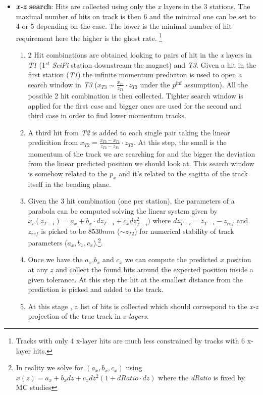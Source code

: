 \documentclass[paper=a4, fontsize=10pt]{scrartcl}
\numberwithin{equation}{section}		%
\numberwithin{figure}{section}			%
\numberwithin{table}{section}				%
\begin{document}
\begin{itemize}
  \item{\textbf{\textit{x-z} search}: Hits are collected using only the \textit{x} layers in the 3 stations. The maximal number of hits on track is then 6 and the minimal one can be set to 4 or 5 depending on the case. The lower is the minimal number of hit requirement here the higher is the ghost rate. \footnote{Tracks with only 4 x-layer hits are much less constrained by tracks with 6 x-layer hits.}}
    \begin{enumerate}
      \item{2 Hit combinations are obtained looking to pairs of hit in the \textit{x} layers in \textit{T1} (1$^{st}$ \textit{SciFi} station downstream the magnet) and \textit{T3}. Given a hit in the first station (\textit{T1}) the infinite momentum prediciton is used to open a search window in \textit{T3} ($x_{T3} \sim \frac{x_{T1}}{z_{T1}}\cdot z_{T3}$ under the $p^{\inf}$ assumption). All the possible 2 hit combination is then collected. Tighter search window is applied for the first \textit{case} and bigger ones are used for the second and third case in order to find lower momentum tracks.}
      \item{A third hit  from \textit{T2} is added to each single pair taking the linear predicition from $x_{T2} = \frac{x_{T3}-x_{T1}}{z_{T3}-z_{T1}}\cdot z_{T2}$. At this step, the small is the momentum of the track we are searching for and the bigger the deviation from the linear predicted position we should look at. This search window is somehow related to the $p_{x}$ and it's related to the sagitta of the track itself in the bending plane.}
      \item{Given the 3 hit combination (one per station), the parameters of a parabola can be computed solving the linear system given by $x_{i}(z_{T-i})= a_{x}+b_{x}\cdot dz_{T-i}+c_{x}dz_{T-i}^{2})$ where $dz_{T-i} = z_{T-i}-z_{ref}$ and $z_{ref}$ is picked to be $8530 mm$ ($\sim z_{T2}$) for numerical stability of track parameters ($a_{x},b_{x},c_{x}$).\footnote{In reality we solve for $(a_{x},b_{x},c_{x})$ using $x(z)=a_{x}+b_{x}dz+c_{x}dz^{2}(1+dRatio\cdot dz)$ where the \textit{dRatio} is fixed by MC studies}}.
      \item{Once we have the $a_{x}$,$b_{x}$ and $c_{x}$ we can compute the predicted $x$ position at any $z$ and collect the found hits around the expected position inside a given tolerance. At this step the hit at the smallest distance from the prediction is picked and added to the track.}
      \item{At this stage , a list of hits is collected which should correspond to the \textit{x-z} projection of the true track in \textit{x-layers}.}

\end{enumerate}
\end{itemize}
\end{document}
